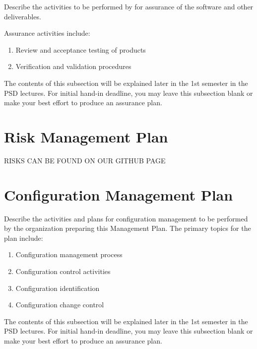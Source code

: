 \documentclass{l3deliverable}
\begin{document}
{Describe the activities to be performed by for assurance of the
software and other deliverables.

Assurance activities include:
\begin{enumerate}
\item Review and acceptance testing of products
\item Verification and validation procedures
\end{enumerate}

The contents of this subsection will be explained later in the 1st
semester in the PSD lectures. For initial hand-in deadline, you may
leave this subsection blank or make your best effort to produce an
assurance plan.


\section{Risk Management Plan}

RISKS CAN BE FOUND ON OUR GITHUB PAGE



\section{Configuration Management Plan}

Describe the activities and plans for configuration management to be
performed by the organization preparing this Management Plan. The
primary topics for the plan include:

\begin{enumerate}
\item Configuration management process
\item Configuration control activities
\item Configuration identification
\item Configuration change control
\end{enumerate}

The contents of this subsection will be explained later in the 1st
semester in the PSD lectures. For initial hand-in deadline, you may
leave this subsection blank or make your best effort to produce an
assurance plan.


}
\end{document}
